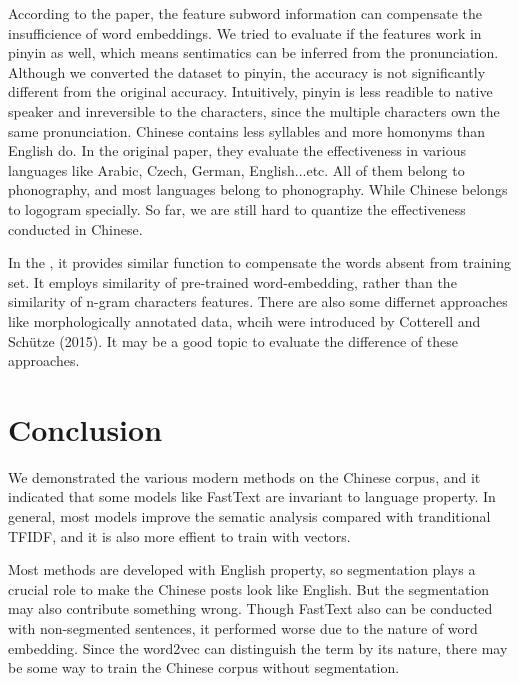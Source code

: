 According to the paper, the feature subword information can compensate the insufficience of word embeddings. 
We tried to evaluate if the features work in pinyin as well, which means sentimatics can be inferred from the pronunciation. 
Although we converted the dataset to pinyin, the accuracy is not significantly different from the original accuracy. 
Intuitively, pinyin is less readible to native speaker and inreversible to the characters, since the multiple characters own the same pronunciation. 
Chinese contains less syllables and more homonyms than English do. In the original paper\cite{bojanowski2016enriching}, they evaluate the effectiveness in various languages like Arabic, Czech, German, English...etc.
All of them belong to phonography, and most languages belong to phonography. While Chinese belongs to logogram specially. So far, we are still hard to quantize the effectiveness conducted in Chinese.

In the \cite{DBLP:journals/corr/MikolovLS13}, it provides similar function to compensate the words absent from training set. 
It employs similarity of pre-trained word-embedding, rather than the similarity of n-gram characters features. 
There are also some differnet approaches like morphologically annotated data, whcih were introduced by Cotterell and Schütze (2015).
It may be a good topic to evaluate the difference of these approaches. 

\section{Conclusion}

We demonstrated the various modern methods on the Chinese corpus, and it indicated that some models like FastText are invariant to language property. 
In general, most models improve the sematic analysis compared with tranditional TFIDF, and it is also more effient to train with vectors.

Most methods are developed with English property, so segmentation plays a crucial role to make the Chinese posts look like English.
 But the segmentation may also contribute something wrong. Though FastText also can be conducted with non-segmented sentences, it performed worse due to the nature of word embedding.
Since the word2vec can distinguish the term by its nature, there may be some way to train the Chinese corpus without segmentation.

